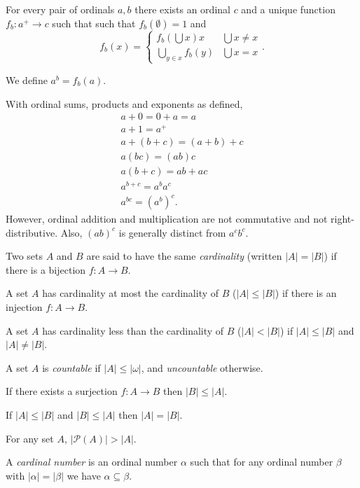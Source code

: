 \begin{prop}
  For every pair of ordinals $a,b$ there exists an ordinal $c$ and a unique
  function $f_b:a^+\to c$ such that such that $f_b(\emptyset)=1$ and
  \[f_b(x)=\begin{cases} f_b(\bigcup x)x&\bigcup x\ne x \\ \bigcup_{y\in
  x}f_b(y)&\bigcup x=x\end{cases}.\]
\end{prop}
\begin{defn}
  We define $a^b=f_b(a)$.
\end{defn}
\begin{prop}
  With ordinal sums, products and exponents as defined,
  \begin{align*}
    a+0=0+a=a \\
    a+1=a^+ \\
    a+(b+c)=(a+b)+c \\
    a(bc)=(ab)c \\
    a(b+c)=ab+ac \\
    a^{b+c}=a^b a^c \\
    a^{bc}=(a^b)^c.
  \end{align*}
  However, ordinal addition and multiplication are not commutative and not
  right-distributive. Also, $(ab)^c$ is generally distinct from $a^c b^c$.
\end{prop}
\begin{defn}
  Two sets $A$ and $B$ are said to have the same \emph{cardinality} (written
  $|A|=|B|$) if there is a bijection $f:A\to B$.

  A set $A$ has cardinality at most the cardinality of $B$ ($|A|\le|B|$) if
  there is an injection $f:A\to B$.

  A set $A$ has cardinality less than the cardinality of $B$ ($|A|<|B|$) if
  $|A|\le|B|$ and $|A|\ne|B|$.

  A set $A$ is \emph{countable} if $|A|\le |\omega|$, and \emph{uncountable}
  otherwise.
\end{defn}
\begin{prop}
  If there exists a surjection $f:A\to B$ then $|B|\le|A|$.
\end{prop}
\begin{thm}
  If $|A|\le|B|$ and $|B|\le|A|$ then $|A|=|B|$.
\end{thm}
\begin{thm}[Cantor]
  For any set $A$, $|\mathcal P(A)|>|A|$.
\end{thm}
\begin{defn}
  A \emph{cardinal number} is an ordinal number $\alpha$ such that for any
  ordinal number $\beta$ with $|\alpha|=|\beta|$ we have $\alpha\subseteq\beta$.
\end{defn}
